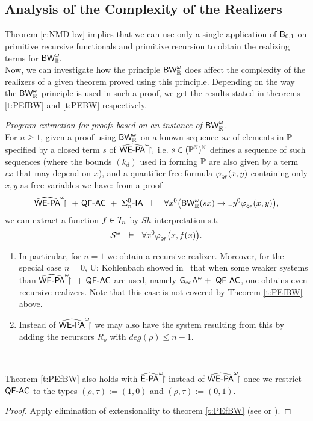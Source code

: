 \subsection {Analysis of the Complexity of the Realizers} \label{ss:acr}

\newcommand{\tn}{$t\in\T_n$}
\newcommand{\tsn}{$t\in\T_0$}

Theorem \ref{c:NMD-bw} implies that we can use only a single
application of $\textsf{\upshape B}_{0,1}$ on primitive recursive functionals
and primitive recursion to obtain the realizing terms for $\textsf{\upshape BW}^\omega_{\mathbb{R}}.$ \\
Now, we can investigate how the principle $\textsf{\upshape BW}^\omega_{\mathbb{R}}$ does affect the
complexity of the realizers of a given theorem proved using this principle.
Depending on the way the $\textsf{\upshape BW}^\omega_{\mathbb{R}}$-principle is used in such a proof, 
we get the results stated in theorems \ref{t:PEfBW} and \ref{t:PEBW} 
respectively.\\
%
\begin{thm}{\em Program extraction for proofs based on an instance of 
$\textsf{\upshape BW}^\omega_{\mathbb{R}}$.\\} 
\label{t:PEfBW}
For $n\geq1$, given a proof using $\textsf{\upshape BW}^\omega_{\mathbb{R}}$ on a known sequence $sx$ 
of elements in $\mathbb{P}$ 
specified by a closed term $s$ of $\widehat{\textsf{\upshape WE-PA}}^\omega\!\!\!\restriction,$ 
i.e. $s\in(\mathbb{P}^{\mathbb{N}})^{\mathbb{N}}$ defines a sequence of such sequences  
(where the bounds $(k_d)$ used in forming 
$\mathbb{P}$ are also given by a term $rx$ that may depend on $x$), and a 
quantifier-free formula $\varphi_{_{\textsf{\upshape QF}}}(x,y)$ containing only $x,y$ as 
free variables we have: from a proof 
\[
\hrrwepa\ +\ \QFm\AC\ +\ \Sigma^0_n\usftext{-IA}\ \ \vdash\ \ 
    \forall x^0\big(\BW^\omega_\RR(sx)\rightarrow\exists y^0 
\phi_{_\QF}(x,y)\big)\text{,}
\]
we can extract a function $f\in\mathcal{T}_n$ by $Sh$-interpretation s.t.
\[
\mathcal{S} ^\omega\ \ \vDash\ \ \forall x^0 \varphi_{_{\textsf{\upshape QF}}}\big(x,f(x)\big) \text{.}
\]
\end{thm}
\begin{remark}
\begin{enumerate}
\item
In particular, for $n=1$ we obtain a \lOrdm{\omega^{\omega^\omega}} 
recursive realizer.
Moreover, for the special case $n=0$, U: Kohlenbach showed 
in~\cite{Kohlenbach98} that when some weaker systems
than $\widehat{\textsf{\upshape WE-PA}}^\omega\!\!\!\restriction\ +\ \textsf{\upshape QF-}\textsf{\upshape AC}$ are used, namely 
$\usftext{G}_{\infty}\usftext{A}^\omega+\ \QFm\AC$,
one obtains even \lOrdm{\omega^\omega}recursive realizers. Note that this 
case is not covered by Theorem \ref{t:PEfBW} above.
\item 
Instead of $\widehat{\textsf{\upshape WE-PA}}^\omega\!\!\!\restriction$ we may also have the system resulting from this 
by adding the recursors $R_{\rho}$ with $deg(\rho)\le n-1.$
\end{enumerate} \mbox{ }
\end{remark}
\begin{cor} Theorem \ref{t:PEfBW} also holds with $\widehat{\textsf{\upshape E-PA}}^\omega\!\!\!\restriction$ instead of 
$\widehat{\textsf{\upshape WE-PA}}^\omega\!\!\!\restriction$ once we restrict $\textsf{\upshape QF-}\textsf{\upshape AC}$ to the types $(\rho,\tau):=(1,0)$ and 
$(\rho,\tau):=(0,1).$
\end{cor} 
\begin{proof} Apply elimination of extensionality to theorem \ref{t:PEfBW} 
(see \cite{Luckhardt73} or \cite{Kohlenbach06}). 
\end{proof}


